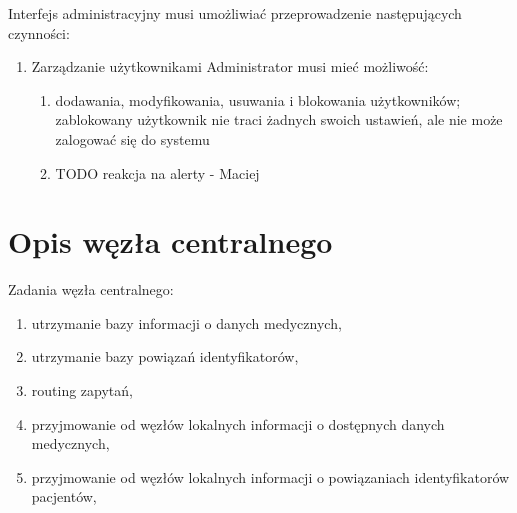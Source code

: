 \documentclass[a4paper]{report}
\begin{document}
Interfejs administracyjny musi umożliwiać przeprowadzenie następujących czynności:
\begin{enumerate}
  \item Zarządzanie użytkownikami
        Administrator musi mieć możliwość:
        \begin{enumerate}
          \item dodawania, modyfikowania, usuwania i blokowania użytkowników; zablokowany użytkownik nie traci
          żadnych swoich ustawień, ale nie może zalogować się do systemu
          \item TODO reakcja na alerty - Maciej
        \end{enumerate}
\end{enumerate}

\section{Opis węzła centralnego}
Zadania węzła centralnego:
\begin{enumerate}
\item utrzymanie bazy informacji o danych medycznych,
\item utrzymanie bazy powiązań identyfikatorów,
\item routing zapytań,
\item przyjmowanie od węzłów lokalnych informacji o dostępnych danych medycznych,
\item przyjmowanie od węzłów lokalnych informacji o powiązaniach identyfikatorów pacjentów,
\end{enumerate}
\end{document}
